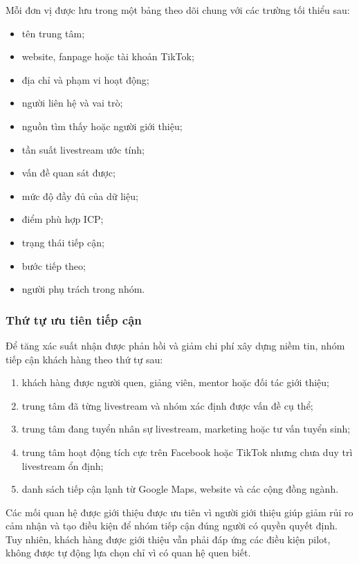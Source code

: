 Mỗi đơn vị được lưu trong một bảng theo dõi chung với các trường tối thiểu sau:

\begin{itemize}
    \item tên trung tâm;
    \item website, fanpage hoặc tài khoản TikTok;
    \item địa chỉ và phạm vi hoạt động;
    \item người liên hệ và vai trò;
    \item nguồn tìm thấy hoặc người giới thiệu;
    \item tần suất livestream ước tính;
    \item vấn đề quan sát được;
    \item mức độ đầy đủ của dữ liệu;
    \item điểm phù hợp ICP;
    \item trạng thái tiếp cận;
    \item bước tiếp theo;
    \item người phụ trách trong nhóm.
\end{itemize}

\subsubsection{Thứ tự ưu tiên tiếp cận}

Để tăng xác suất nhận được phản hồi và giảm chi phí xây dựng niềm tin, nhóm tiếp cận khách hàng theo thứ tự sau:

\begin{enumerate}
    \item khách hàng được người quen, giảng viên, mentor hoặc đối tác giới thiệu;
    \item trung tâm đã từng livestream và nhóm xác định được vấn đề cụ thể;
    \item trung tâm đang tuyển nhân sự livestream, marketing hoặc tư vấn tuyển sinh;
    \item trung tâm hoạt động tích cực trên Facebook hoặc TikTok nhưng chưa duy trì livestream ổn định;
    \item danh sách tiếp cận lạnh từ Google Maps, website và các cộng đồng ngành.
\end{enumerate}

Các mối quan hệ được giới thiệu được ưu tiên vì người giới thiệu giúp giảm rủi ro cảm nhận và tạo điều kiện để nhóm tiếp cận đúng người có quyền quyết định. Tuy nhiên, khách hàng được giới thiệu vẫn phải đáp ứng các điều kiện pilot, không được tự động lựa chọn chỉ vì có quan hệ quen biết.

